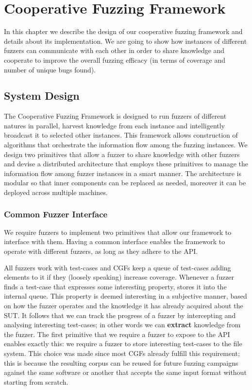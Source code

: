 \chapter{Cooperative Fuzzing Framework}
In this chapter we describe the design of our cooperative fuzzing framework and
details about its implementation. We are going to show how instances of
different fuzzers can communicate with each other in order to share knowledge
and cooperate to improve the overall fuzzing efficacy (in terms of coverage and
number of unique bugs found).

\section{System Design}
The Cooperative Fuzzing Framework is designed to run fuzzers of different
natures in parallel, harvest knowledge from each instance and intelligently
broadcast it to selected other instances. This framework allows construction of
algorithms that orchestrate the information flow among the fuzzing instances. We
design two primitives that allow a fuzzer to share knowledge with other fuzzers
and devise a distributed architecture that employs these primitives to manage
the information flow among fuzzer instances in a smart manner. The architecture
is modular so that inner components can be replaced as needed, moreover it can
be deployed across multiple machines.

\subsection{Common Fuzzer Interface}
\label{sec:system-design-api}
We require fuzzers to implement two primitives that allow our framework to
interface with them. Having a common interface enables the framework to operate
with different fuzzers, as long as they adhere to the \ac{API}.

All fuzzers work with test-cases and \acp{CGF} keep a queue of test-cases adding
elements to it if they (loosely speaking) increase coverage. Whenever a fuzzer
finds a test-case that expresses some interesting property, stores it into the
internal queue. This property is deemed interesting in a subjective manner,
based on how the fuzzer operates and the knowledge it has already acquired about
the \ac{SUT}. It follows that we can track the progress of a fuzzer by
intercepting and analysing interesting test-cases; in other words we can
\textbf{extract} knowledge from the fuzzer. The first primitive that we require
a fuzzer to expose to the \ac{API} enables exactly this: we require a fuzzer to
store interesting test-cases to the file system. This choice was made since most
\acp{CGF} already fulfill this requirement; this is because the resulting corpus
can be reused for future fuzzing campaigns against the same software or another
that accepts the same input format without starting from scratch.

